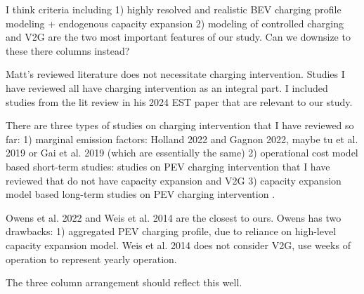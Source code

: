 I think criteria including 
1) highly resolved and realistic BEV charging profile modeling + endogenous capacity expansion 
2) modeling of controlled charging and V2G 
are the two most important features of our study. Can we downsize to these there columns instead?

Matt's reviewed literature does not necessitate charging intervention. Studies I have reviewed all have charging intervention as an integral part. I included studies from the lit review in his 2024 EST paper that are relevant to our study.

There are three types of studies on charging intervention that I have reviewed so far: 
1) marginal emission factors: Holland 2022 and Gagnon 2022, maybe tu et al. 2019 or Gai et al. 2019 (which are essentially the same)
2) operational cost model based short-term studies: studies on PEV charging intervention that I have reviewed that do not have capacity expansion and V2G
3) capacity expansion model based long-term studies on PEV charging intervention . 

Owens et al. 2022 and Weis et al. 2014 are the closest to ours. Owens has two drawbacks: 1) aggregated PEV charging profile, due to reliance on high-level capacity expansion model. Weis et al. 2014 does not consider V2G, use weeks of operation to represent yearly operation.

The three column arrangement should reflect this well.



